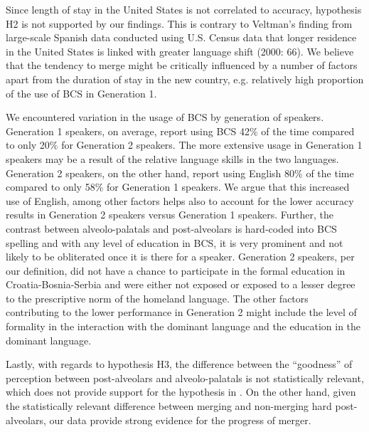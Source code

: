 \documentclass[output=paper,modfonts,nonflat,
]{langsci/langscibook}
\begin{document}
Since length of stay in the United States is not correlated to accuracy, hypothesis H2 is not supported by our findings. This is contrary to Veltman’s finding from large-scale Spanish data conducted using U.S. Census data that longer residence in the United States is linked with greater language shift (2000: 66). We believe that the tendency to merge might be critically influenced by a number of factors apart from the duration of stay in the new country, e.g. relatively high proportion of the use of BCS in Generation 1.



We encountered variation in the usage of BCS by generation of speakers. Generation 1 speakers, on average, report using BCS 42\% of the time compared to only 20\% for Generation 2 speakers. The more extensive usage in Generation 1 speakers may be a result of the relative language skills in the two languages. Generation 2 speakers, on the other hand, report using English 80\% of the time compared to only 58\% for Generation 1 speakers. We argue that this increased use of English, among other factors helps also to account for the lower accuracy results in Generation 2 speakers versus Generation 1 speakers. Further, the contrast between alveolo-palatals and post-alveolars is hard-coded into BCS spelling and with any level of education in BCS, it is very prominent and not likely to be obliterated once it is there for a speaker. Generation 2 speakers, per our definition, did not have a chance to participate in the formal education in Croatia-Bosnia-Serbia and were either not exposed or exposed to a lesser degree to the prescriptive norm of the homeland language. The other factors contributing to the lower performance in Generation 2 might include the level of formality in the interaction with the dominant language and the education in the dominant language.



Lastly, with regards to hypothesis H3, the difference between the “goodness” of perception between post-alveolars and alveolo-palatals is not statistically relevant, which does not provide support for the hypothesis in \citet{Ćavaretal2016}. On the other hand, given the statistically relevant difference between merging and non-merging hard post-alveolars, our data provide strong evidence for the progress of merger.
\end{document}
